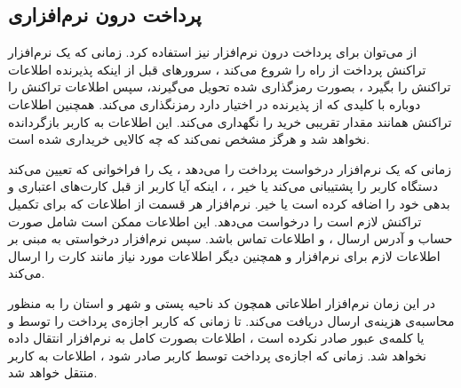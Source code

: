 \documentclass[oneside]{report}
\begin{document}
   \subsection{پرداخت درون نرم‌افزاری}
از 
     {\normalsize {}}
     می‌توان برای پرداخت درون‌ نرم‌افزار نیز  استفاده کرد.  زمانی که یک نرم‌افزار  تراکنش پرداخت از راه 
      {\normalsize {}} 
      را شروع می‌کند ،  سرورهای 
      {\normalsize {}}
      قبل از اینکه پذیرنده اطلاعات تراکنش را بگیرد ، بصورت رمزگذاری شده تحویل می‌گیرند، سپس 
          {\normalsize {}} 
   اطلاعات تراکنش  را دوباره با کلیدی که از پذیرنده در اختیار دارد رمزنگذاری می‌کند. 
        {\normalsize {}} 
        همچنین اطلاعات  تراکنش همانند مقدار تقریبی خرید را نگهداری می‌کند. این اطلاعات به کاربر بازگردانده نخواهد شد و هرگز مشخص نمی‌کند که چه کالایی خریداری شده‌ است. 
        
زمانی که یک نرم‌افزار درخواست پرداخت را می‌دهد ، یک 
{\normalsize {}} 
    را فراخوانی که تعیین می‌کند دستگاه کاربر 
    {\normalsize {}} 
   را پشتیبانی می‌کند یا خیر ، ، اینکه آیا کاربر از قبل کارت‌های اعتباری و بدهی خود را اضافه کرده است یا خیر.
   نرم‌افزار هر قسمت از اطلاعات که برای تکمیل  تراکنش لازم است  را درخواست می‌دهد. این اطلاعات ممکن است شامل صورت حساب و آدرس ارسال ، و اطلاعات تماس باشد. سپس نرم‌افزار درخواستی به 
   {\normalsize {}} 
   مبنی بر اطلاعات لازم برای نرم‌افزار و همچنین دیگر اطلاعات مورد نیاز مانند کارت را ارسال می‌کند. 

  در این زمان نرم‌افزار اطلاعاتی همچون کد ناحیه پستی و شهر و استان را به منظور محاسبه‌ی هزینه‌ی ارسال دریافت می‌کند. تا زمانی که کاربر اجازه‌ی پرداخت را توسط 
  {\normalsize {}} 
  و یا کلمه‌ی عبور صادر نکرده است ، اطلاعات بصورت کامل به نرم‌افزار انتقال داده نخواهد شد. زمانی که اجازه‌ی 	پرداخت توسط کاربر صادر شود ، اطلاعات به کاربر منتقل خواهد شد. 
  
\end{document}
